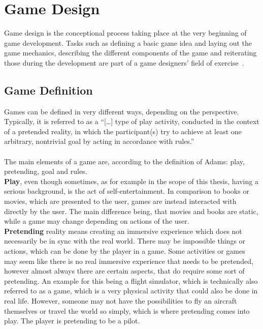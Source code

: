 \section{Game Design}\label{sec:game-design}
Game design is the conceptional process taking place at the very beginning of game development.
Tasks such as defining a basic game idea and laying out the game mechanics, describing the different components of the game and
reiterating those during the development are part of a game designers' field of exercise~\cite{10.5555/2544002}.

\subsection{Game Definition}\label{subsec:game-definition}
Games can be defined in very different ways, depending on the perspective.
Typically, it is referred to as a ``[\ldots] type of play activity, conducted in the context of a pretended reality, in which the participant(s)
try to achieve at least one arbitrary, nontrivial goal by acting in accordance with rules.''~\cite{10.5555/2544002}
\\
\\
The main elements of a game are, according to the definition of Adams: play, pretending, goal and rules.
\\
\textbf{Play}, even though sometimes, as for example in the scope of this thesis, having a serious background, is the act of
self-entertainment.
In comparison to books or movies, which are presented to the user, games are instead interacted with directly by the user.
The main difference being, that movies and books are static, while a game may change depending on actions of the user.
\\
\textbf{Pretending} reality means creating an immersive experience which does not necessarily be in sync with the real world.
There may be impossible things or actions, which can be done by the player in a game.
Some activities or games may seem like there is no real immersive experience that needs to be pretended, however almost always there are certain
aspects, that do require some sort of pretending.
An example for this being a flight simulator, which is technically also referred to as a game, which is a very physical activity that could also be done
in real life.
However, someone may not have the possibilities to fly an aircraft themselves or travel the world so simply, which is where pretending comes into play.
The player is pretending to be a pilot. 
